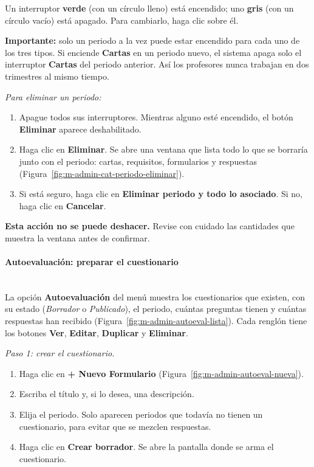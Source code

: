 Un interruptor \textbf{verde} (con un círculo lleno) está encendido; uno \textbf{gris} (con un círculo vacío) está apagado. Para cambiarlo, haga clic sobre él.

\textbf{Importante:} solo un periodo a la vez puede estar encendido para cada uno de los tres tipos. Si enciende \textbf{Cartas} en un periodo nuevo, el sistema apaga solo el interruptor \textbf{Cartas} del periodo anterior. Así los profesores nunca trabajan en dos trimestres al mismo tiempo.

\textit{Para eliminar un periodo:}
\begin{enumerate}
    \item Apague todos sus interruptores. Mientras alguno esté encendido, el botón \textbf{Eliminar} aparece deshabilitado.
    \item Haga clic en \textbf{Eliminar}. Se abre una ventana que lista todo lo que se borraría junto con el periodo: cartas, requisitos, formularios y respuestas (Figura~\ref{fig:m-admin-cat-periodo-eliminar}).
    \item Si está seguro, haga clic en \textbf{Eliminar periodo y todo lo asociado}. Si no, haga clic en \textbf{Cancelar}.
\end{enumerate}


\textbf{Esta acción no se puede deshacer.} Revise con cuidado las cantidades que muestra la ventana antes de confirmar.

\paragraph{Autoevaluación: preparar el cuestionario}\label{apx:manual-user:admin-autoeval}\mbox{}\\
La opción \textbf{Autoevaluación} del menú muestra los cuestionarios que existen, con su estado (\emph{Borrador} o \emph{Publicado}), el periodo, cuántas preguntas tienen y cuántas respuestas han recibido (Figura~\ref{fig:m-admin-autoeval-lista}). Cada renglón tiene los botones \textbf{Ver}, \textbf{Editar}, \textbf{Duplicar} y \textbf{Eliminar}.


\textit{Paso 1: crear el cuestionario.}
\begin{enumerate}
    \item Haga clic en \textbf{+ Nuevo Formulario} (Figura~\ref{fig:m-admin-autoeval-nueva}).
    \item Escriba el título y, si lo desea, una descripción.
    \item Elija el periodo. Solo aparecen periodos que todavía no tienen un cuestionario, para evitar que se mezclen respuestas.
    \item Haga clic en \textbf{Crear borrador}. Se abre la pantalla donde se arma el cuestionario.
\end{enumerate}

